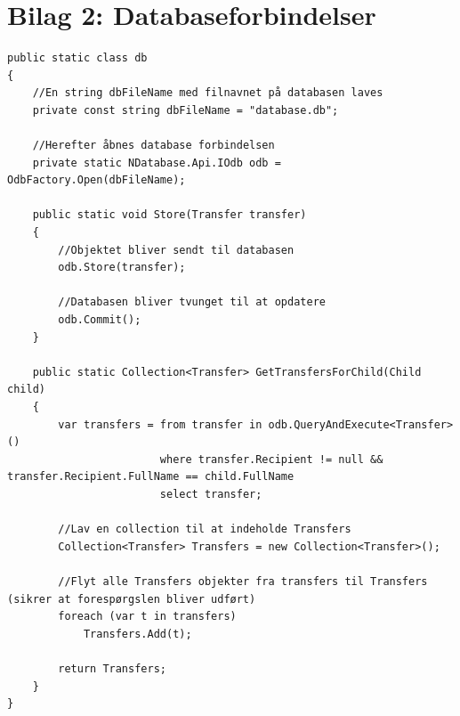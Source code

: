 \chapter*{Bilag 2: Databaseforbindelser}
\thispagestyle{empty}
\setcounter{page}{1}
\begin{lstlisting}[caption={Statisk klasse, der forbinder til objekt databasen NDatabase},label={lst:db}]
public static class db
{
	//En string dbFileName med filnavnet på databasen laves
	private const string dbFileName = "database.db";
	
	//Herefter åbnes database forbindelsen
	private static NDatabase.Api.IOdb odb = OdbFactory.Open(dbFileName);

	public static void Store(Transfer transfer)
	{
		//Objektet bliver sendt til databasen
		odb.Store(transfer);
		
		//Databasen bliver tvunget til at opdatere
		odb.Commit();
	}
	
	public static Collection<Transfer> GetTransfersForChild(Child child)
	{
		var transfers = from transfer in odb.QueryAndExecute<Transfer>()
						where transfer.Recipient != null && transfer.Recipient.FullName == child.FullName
						select transfer;

		//Lav en collection til at indeholde Transfers
		Collection<Transfer> Transfers = new Collection<Transfer>();

		//Flyt alle Transfers objekter fra transfers til Transfers (sikrer at forespørgslen bliver udført)
		foreach (var t in transfers)
			Transfers.Add(t);

		return Transfers;
	}
}
\end{lstlisting}

